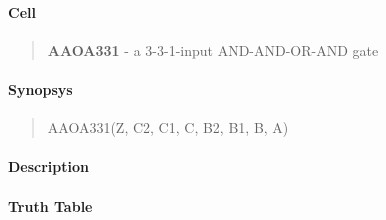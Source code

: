 \label{AAOA331}
\paragraph{Cell}
\begin{quote}
    \textbf{AAOA331} - a 3-3-1-input AND-AND-OR-AND gate
\end{quote}

\paragraph{Synopsys}
\begin{quote}
    AAOA331(Z, C2, C1, C, B2, B1, B, A)
\end{quote}

\paragraph{Description}

%

\paragraph{Truth Table}
%

